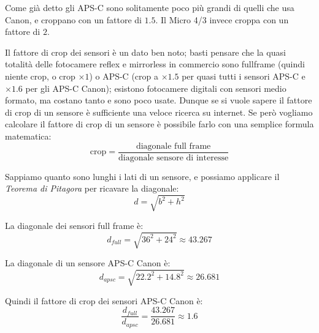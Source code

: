 Come già detto gli APS-C sono solitamente poco più grandi di quelli che usa Canon, e croppano con un fattore di $1.5$. Il Micro 4/3 invece croppa con un fattore di $2$.

Il fattore di crop dei sensori è un dato ben noto; basti pensare che la quasi totalità delle fotocamere reflex e mirrorless in commercio sono fullframe (quindi niente crop, o crop $\times 1$) o APS-C (crop a $\times 1.5$ per quasi tutti i sensori APS-C e $\times 1.6$ per gli APS-C Canon); esistono fotocamere digitali con sensori medio formato, ma costano tanto e sono poco usate. Dunque se si vuole sapere il fattore di crop di un sensore è sufficiente una veloce ricerca su internet.
Se però vogliamo calcolare il fattore di crop di un sensore è possibile farlo con una semplice formula matematica:
\begin{equation}
    \text{crop} = \dfrac{\text{diagonale full frame}}{\text{diagonale sensore di interesse}}
    \label{eq:crop}
\end{equation}


Sappiamo quanto sono lunghi i lati di un sensore, e possiamo applicare il \textit{Teorema di Pitagora} per ricavare la diagonale:
\begin{equation}
    d = \sqrt{b^2 + h^2}
\end{equation}

La diagonale dei sensori full frame è:
\begin{equation}
    d_{full} = \sqrt{36^2 + 24^2} \approx 43.267
\end{equation}

La diagonale di un sensore APS-C Canon è:
\begin{equation}
    d_{apsc} = \sqrt{22.2^2 + 14.8^2} \approx 26.681
\end{equation}

Quindi il fattore di crop dei sensori APS-C Canon è:
\begin{equation}
    \dfrac{d_{full}}{d_{apsc}} = \dfrac{43.267}{26.681} \approx 1.6
\end{equation}

